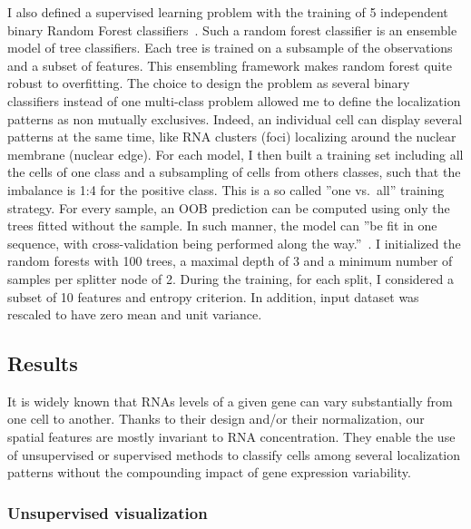 I also defined a supervised learning problem with the training of 5 independent binary Random Forest classifiers~\cite{breiman_random_2001}.
Such a random forest classifier is an ensemble model of tree classifiers.
Each tree is trained on a subsample of the observations and a subset of features.
This ensembling framework makes random forest quite robust to overfitting.
The choice to design the problem as several binary classifiers instead of one multi-class problem allowed me to define the localization patterns as non mutually exclusives.
Indeed, an individual cell can display several patterns at the same time, like \ac{RNA} clusters (foci) localizing around the nuclear membrane (nuclear edge).
For each model, I then built a training set including all the cells of one class and a subsampling of cells from others classes, such that the imbalance is 1:4 for the positive class.
This is a so called ''one vs.\ all'' training strategy.
For every sample, an \ac{OOB} prediction can be computed using only the trees fitted without the sample.
In such manner, the model can ''be fit in one sequence, with cross-validation being performed along the way.''~\cite{hastie_elements_2009}.
I initialized the random forests with 100 trees, a maximal depth of 3 and a minimum number of samples per splitter node of 2.
During the training, for each split, I considered a subset of 10 features and entropy criterion.
In addition, input dataset was rescaled to have zero mean and unit variance.

\subsection{Results}
\label{subsec:results_general_pattern}

It is widely known that RNAs levels of a given gene can vary substantially from one cell to another.
Thanks to their design and/or their normalization, our spatial features are mostly invariant to \ac{RNA} concentration.
They enable the use of unsupervised or supervised methods to classify cells among several localization patterns without the compounding impact of gene expression variability.

\subsubsection{Unsupervised visualization}

